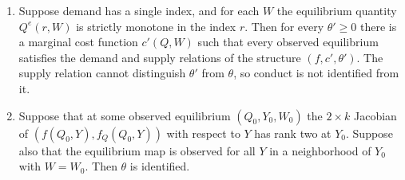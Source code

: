 \begin{theorem}[Lau]\label{prop:03-lau}
\leavevmode
\begin{enumerate}[label=(\roman*)]
\item Suppose demand has a single index, and for each $W$ the equilibrium quantity $Q^e(r, W)$ is strictly monotone in
  the index $r$. Then for every $\theta' \ge 0$ there is a marginal cost function $c'(Q, W)$ such that every observed
  equilibrium satisfies the demand and supply relations of the structure $(f, c', \theta')$. The supply relation cannot
  distinguish $\theta'$ from $\theta$, so conduct is not identified from it.
\item Suppose that at some observed equilibrium $(Q_0, Y_0, W_0)$ the $2 \times k$ Jacobian of
  $\left(f(Q_0, Y), f_Q(Q_0, Y)\right)$ with respect to $Y$ has rank two at $Y_0$. Suppose also that the equilibrium
  map is observed for all $Y$ in a neighborhood of $Y_0$ with $W = W_0$. Then $\theta$ is identified.
\end{enumerate}
\end{theorem}

